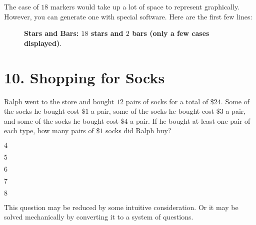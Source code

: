 \documentclass[12pt]{article}
\begin{document}

\clearpage
The case of $18$ markers would take up a lot of space to represent graphically. However, you can generate one with special software. Here are the first few lines:
\begin{figure}[hptb]
\begin{minipage}[b]{\textwidth}
\centering
{}
\caption{\textbf{Stars and Bars: $18$ stars and $2$ bars (only a few cases displayed)}.
\label{fig:stars:bars:18:cropped}}
\end{minipage}
\end{figure}


\clearpage
\section*{10. Shopping for Socks}
\begin{question}
Ralph went to the store and bought $12$ pairs of socks for a total of $\$24$. Some of the socks he bought cost $\$1$ a pair, some of the socks he bought cost $\$3$ a pair, and some of the socks he bought cost $\$4$ a pair. If he bought at least one pair of each type, how many pairs of $\$1$ socks did Ralph buy?
\begin{enumerate*}
  \item $4$
  \item $5$
  \item $6$
  \item $7$
  \item $8$
\end{enumerate*}
\end{question}

This question may be reduced by some intuitive consideration. Or it may be solved mechanically by converting it to a system of questions. 
\end{document}
